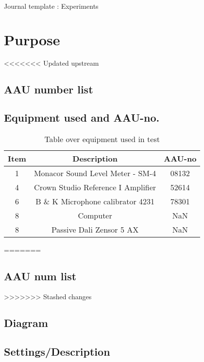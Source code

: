 \documentclass[12pt,a4paper]{article}
\newcommand{\ra}[1]{\renewcommand{\arraystretch}{#1}}
\begin{document}
\begin{Huge}
\begin{center}
Journal template : Experiments
\end{center}
\end{Huge}


\vspace{1cm}
\section{Purpose}
<<<<<<< Updated upstream
\subsection{AAU number list}

\subsection{Equipment used and AAU-no.}

\begin{table}[h]
	\centering
	\ra{1.3}
	\begin{tabular}{ c c c } \toprule
		{Item} & {Description} & {AAU-no} \\ \bottomrule 
		1      &  Monacor Sound Level Meter - SM-4      & 08132   \\
		4      &  Crown Studio Reference I Amplifier    & 52614   \\
		6      &  B \& K Microphone calibrator 4231     & 78301   \\
		8      &  Computer                              & NaN     \\  
		8      &  Passive Dali Zensor 5 AX              & NaN     \\ \bottomrule 
	\end{tabular}
	\caption{Table over equipment used in test}
	\label{tab:UsedEquipmentListning}
\end{table}

=======



\subsection{AAU num list}
>>>>>>> Stashed changes
\subsection{Diagram}
\subsection{Settings/Description}
\end{document}
